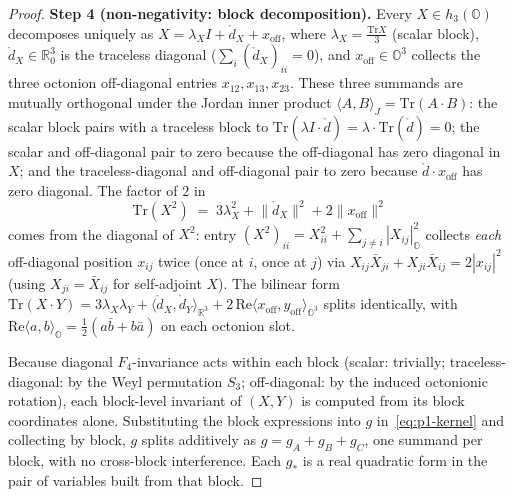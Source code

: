 \documentclass[12pt]{article}
\theoremstyle{remark}
\newcommand{\hthree}{h_3(\mathbb{O})}
\newcommand{\Ffour}{F_4}
\newcommand{\Tr}{\mathrm{Tr}}
\begin{document}
\begin{proof}
\textbf{Step 4 (non-negativity: block decomposition).} Every
$X \in \hthree$ decomposes uniquely as $X = \lambda_X I +
\mathring{d}_X + x_{\mathrm{off}}$, where
$\lambda_X = \tfrac{\Tr X}{3}$ (scalar block),
$\mathring{d}_X \in \mathbb{R}^3_0$ is the traceless diagonal
($\sum_i (\mathring{d}_X)_{ii} = 0$), and
$x_{\mathrm{off}} \in \mathbb{O}^3$ collects the three octonion
off-diagonal entries $x_{12}, x_{13}, x_{23}$. These three
summands are mutually orthogonal under the Jordan inner product
$\langle A, B \rangle_J = \Tr(A \cdot B)$: the scalar block
pairs with a traceless block to $\Tr(\lambda I \cdot
\mathring{d}) = \lambda \cdot \Tr(\mathring{d}) = 0$; the scalar
and off-diagonal pair to zero because the off-diagonal has zero
diagonal in $X$; and the traceless-diagonal and off-diagonal
pair to zero because $\mathring{d} \cdot x_{\mathrm{off}}$ has
zero diagonal. The factor of $2$ in
\[
  \Tr(X^2) \;=\; 3\lambda_X^2 + \lVert \mathring{d}_X \rVert^2 +
    2\lVert x_{\mathrm{off}} \rVert^2
\]
comes from the diagonal of $X^2$: entry
$(X^2)_{ii} = X_{ii}^2 + \sum_{j \neq i} |X_{ij}|_{\mathbb{O}}^2$
collects \emph{each} off-diagonal position $x_{ij}$ twice (once at
$i$, once at $j$) via
$X_{ij} \bar{X}_{ji} + X_{ji} \bar{X}_{ij} = 2|x_{ij}|^2$ (using
$X_{ji} = \bar{X}_{ij}$ for self-adjoint $X$). The bilinear form
$\Tr(X \cdot Y) = 3\lambda_X \lambda_Y +
\langle \mathring{d}_X, \mathring{d}_Y \rangle_{\mathbb{R}^3} +
2\,\mathrm{Re}\langle x_{\mathrm{off}}, y_{\mathrm{off}} \rangle_{\mathbb{O}^3}$
splits identically, with $\mathrm{Re}\langle a, b \rangle_{\mathbb{O}} =
\tfrac{1}{2}(a\bar{b} + b\bar{a})$ on each octonion slot.

Because diagonal $\Ffour$-invariance acts within each block
(scalar: trivially; traceless-diagonal: by the Weyl permutation
$S_3$; off-diagonal: by the induced octonionic rotation), each
block-level invariant of $(X, Y)$ is computed from its block
coordinates alone. Substituting the block expressions into
$g$ in~\eqref{eq:p1-kernel} and collecting by block, $g$ splits
additively as $g = g_A + g_B + g_C$, one summand per block, with
no cross-block interference. Each $g_*$ is a real quadratic form
in the pair of variables built from that block.


\end{proof}
\end{document}
